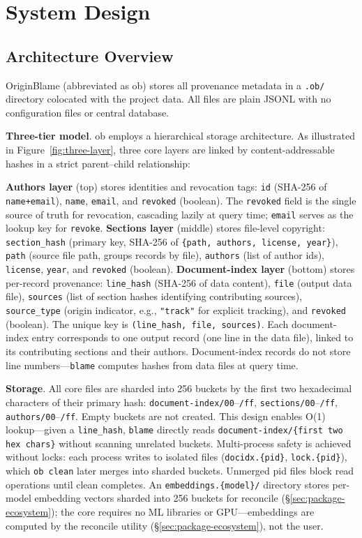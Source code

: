 \section{System Design}

\subsection{Architecture Overview}

OriginBlame (abbreviated as ob) stores all provenance metadata in a \texttt{.ob/} directory colocated with the project data. All files are plain JSONL with no configuration files or central database.

\textbf{Three-tier model}. ob employs a hierarchical storage architecture. As illustrated in Figure~\ref{fig:three-layer}, three core layers are linked by content-addressable hashes in a strict parent--child relationship:

\textbf{Authors layer} (top) stores identities and revocation tags: \texttt{id} (SHA-256 of \texttt{name+email}), \texttt{name}, \texttt{email}, and \texttt{revoked} (boolean). The \texttt{revoked} field is the single source of truth for revocation, cascading lazily at query time; \texttt{email} serves as the lookup key for \texttt{revoke}. \textbf{Sections layer} (middle) stores file-level copyright: \texttt{section\_hash} (primary key, SHA-256 of \texttt{\{path, authors, license, year\}}), \texttt{path} (source file path, groups records by file), \texttt{authors} (list of author ids), \texttt{license}, \texttt{year}, and \texttt{revoked} (boolean). \textbf{Document-index layer} (bottom) stores per-record provenance: \texttt{line\_hash} (SHA-256 of data content), \texttt{file} (output data file), \texttt{sources} (list of section hashes identifying contributing sources), \texttt{source\_type} (origin indicator, e.g., \texttt{"track"} for explicit tracking), and \texttt{revoked} (boolean). The unique key is \texttt{(line\_hash, file, sources)}. Each document-index entry corresponds to one output record (one line in the data file), linked to its contributing sections and their authors. Document-index records do not store line numbers---\texttt{blame} computes hashes from data files at query time.

\textbf{Storage}. All core files are sharded into 256 buckets by the first two hexadecimal characters of their primary hash: \texttt{document-index/00}--\texttt{/ff}, \texttt{sections/00}--\texttt{/ff}, \texttt{authors/00}--\texttt{/ff}. Empty buckets are not created. This design enables O(1) lookup---given a \texttt{line\_hash}, \texttt{blame} directly reads \texttt{document-index/\{first two hex chars\}} without scanning unrelated buckets. Multi-process safety is achieved without locks: each process writes to isolated files (\texttt{docidx.\{pid\}}, \texttt{lock.\{pid\}}), which \texttt{ob clean} later merges into sharded buckets. Unmerged pid files block read operations until clean completes. An \texttt{embeddings.\{model\}/} directory stores per-model embedding vectors sharded into 256 buckets for reconcile (\S\ref{sec:package-ecosystem}); the core requires no ML libraries or GPU---embeddings are computed by the reconcile utility (\S\ref{sec:package-ecosystem}), not the user.

